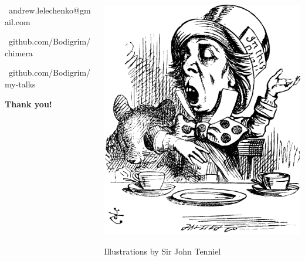 \documentclass[handout]{beamer}
\begin{document}
\begin{frame}

\begin{columns}[T]
  \begin{column}{.51\textwidth}

\bigskip
\bigskip
\bigskip
\bigskip

\par \faAt\ andrew.lelechenko@gmail.com

\bigskip

\par \faGithub\ github.com/Bodigrim/chimera

\bigskip

\par \faGithub\ github.com/Bodigrim/my-talks

\bigskip
\bigskip
\bigskip

\centerline{\Huge\bf Thank you!}

\end{column}

\begin{column}{.5\textwidth}
  \includegraphics[width=1.1\textwidth]{mad-hatter.png}

  {\hfill \tiny Illustrations by Sir John Tenniel}
\end{column}

\end{columns}

\end{frame}
\end{document}
